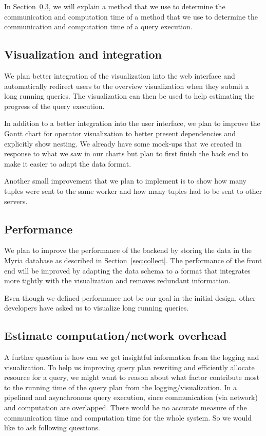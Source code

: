 \documentclass[11pt]{scrartcl}
\begin{document}
In Section~\ref{sec:overhead}, we will explain a method that we use to determine the communication and computation time of a method that we use to determine the communication and computation time of a query execution.


\subsection{Visualization and integration}
\label{sec:vizimprovement}

We plan better integration of the visualization into the web interface and automatically redirect users to the overview visualization when they submit a long running queries. The visualization can then be used to help estimating the progress of the query execution.

In addition to a better integration into the user interface, we plan to improve the Gantt chart for operator visualization to better present dependencies and explicitly show nesting. We already have some mock-ups that we created in response to what we saw in our charts but plan to first finish the back end to make it easier to adapt the data format.

Another small improvement that we plan to implement is to show how many tuples were sent to the same worker and how many tuples had to be sent to other servers.


\subsection{Performance}
\label{sec:performance}

We plan to improve the performance of the backend by storing the data in the Myria database as described in Section~\ref{sec:collect}. The performance of the front end will be improved by adapting the data schema to a format that integrates more tightly with the visualization and removes redundant information.

Even though we defined performance not be our goal in the initial design, other developers have asked us to visualize long running queries.


\subsection{Estimate computation/network overhead}
\label{sec:overhead}

A further question is  how can we get insightful information from the logging and visualization. To help us improving query plan rewriting and efficiently allocate resource for a query, we might want to reason about what factor contribute most to the running time of the query plan from the logging/visualization. In a pipelined and asynchronous query execution, since communication (via network) and computation are overlapped. There would be no accurate measure of the communication time and computation time for the whole system.  So we would like to ask following questions.
\end{document}
